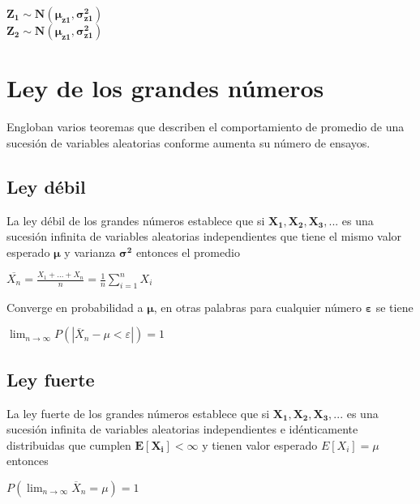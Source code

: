 \documentclass[es-lat]{article}
\begin{document}
\begin{center}
$\mathbf{Z_{1}\sim N(\mu_{z1},\sigma_{z1}^2)}$\\   
$\mathbf{Z_{2}\sim N(\mu_{z1},\sigma_{z1}^2)}$
\end{center}

\section{Ley de los grandes números}

Engloban varios teoremas que describen el comportamiento de promedio de una sucesión de variables aleatorias conforme aumenta su número de ensayos.

\subsection{Ley débil}

La ley débil de los grandes números establece que si $\mathbf{X_{1},X_{2},X_{3},...}$ es una sucesión infinita de variables aleatorias independientes que tiene el mismo valor esperado $\mathbf{\mu}$ y varianza $\mathbf{\sigma^2}$ entonces el promedio 

\begin{center}
    $\overline{X_{n}}=\frac{X_{1}+...+X_{n}}{n}=\frac{1}{n}\sum_{i=1}^{n}X_{i}$
\end{center}

Converge en probabilidad a $\mathbf{\mu}$, en otras palabras para cualquier número $\mathbf{\varepsilon}$ se tiene

\begin{center}
    $\lim_{n \to \infty} P(\left | \overline{X}_{n}-\mu < \varepsilon \right |)=1$
\end{center}

\subsection{Ley fuerte}

La ley fuerte de los grandes números establece que si $\mathbf{X_{1},X_{2},X_{3},...}$ es una sucesión infinita de variables aleatorias independientes e idénticamente distribuidas que cumplen $\mathbf{E[X_{i}]<\infty}$ y tienen valor esperado $E[X_{i}]=\mu$ entonces

\begin{center}
    $P(\lim_{n \to \infty}\overline{X}_{n}=\mu)=1$
\end{center}
\end{document}
